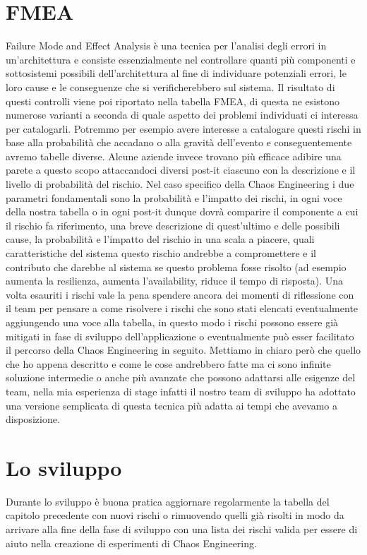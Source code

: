 \section{FMEA}
Failure Mode and Effect Analysis è una tecnica per l'analisi degli errori in un'architettura e consiste essenzialmente nel controllare quanti più componenti e sottosistemi possibili dell'architettura al fine di individuare potenziali errori, le loro cause e le conseguenze che si verificherebbero sul sistema.
Il risultato di questi controlli viene poi riportato nella tabella FMEA, di questa ne esistono numerose varianti a seconda di quale aspetto dei problemi individuati ci interessa per catalogarli.
Potremmo per esempio avere interesse a catalogare questi rischi in base alla probabilità che accadano o alla gravità dell'evento e conseguentemente avremo tabelle diverse.
Alcune aziende invece trovano più efficace adibire una parete a questo scopo attaccandoci diversi post-it ciascuno con la descrizione e il livello di probabilità del rischio.
Nel caso specifico della Chaos Engineering i due parametri fondamentali sono la probabilità e l'impatto dei rischi, in ogni voce della nostra tabella o in ogni post-it dunque dovrà comparire il componente a cui il rischio fa riferimento, una breve descrizione di quest'ultimo e delle possibili cause, la probabilità e l'impatto del rischio in una scala a piacere, quali caratteristiche del sistema questo rischio andrebbe a compromettere e il contributo che darebbe al sistema se questo problema fosse risolto (ad esempio aumenta la resilienza, aumenta l'availability, riduce il tempo di risposta).
Una volta esauriti i rischi vale la pena spendere ancora dei momenti di riflessione con il team per pensare a come risolvere i rischi che sono stati elencati eventualmente aggiungendo una voce alla tabella, in questo modo i rischi possono essere già mitigati in fase di sviluppo dell'applicazione o eventualmente può esser facilitato il percorso della Chaos Engineering in seguito.
Mettiamo in chiaro però che quello che ho appena descritto e come le cose andrebbero fatte ma ci sono infinite soluzione intermedie o anche più avanzate che possono adattarsi alle esigenze del team, nella mia esperienza di stage infatti il nostro team di sviluppo ha adottato una versione semplicata di questa tecnica più adatta ai tempi che avevamo a disposizione.

\section{Lo sviluppo}
Durante lo sviluppo è buona pratica aggiornare regolarmente la tabella del capitolo precedente con nuovi rischi o rimuovendo quelli già risolti in modo da arrivare alla fine della fase di sviluppo con una lista dei rischi valida per essere di aiuto nella creazione di esperimenti di Chaos Engineering.

